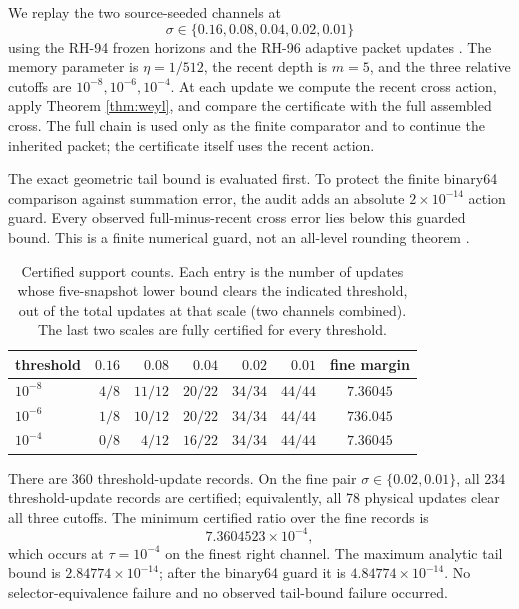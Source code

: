 \documentclass[11pt]{article}
\theoremstyle{definition}
\theoremstyle{remark}
\begin{document}
We replay the two source-seeded channels at
\[
 \sigma\in\{0.16,0.08,0.04,0.02,0.01\}
\]
using the RH-94 frozen horizons and the RH-96 adaptive packet updates
\citep{WangWeakMode2026}.  The
memory parameter is $\eta=1/512$, the recent depth is $m=5$, and the three
relative cutoffs are $10^{-8},10^{-6},10^{-4}$.  At each update we compute
the recent cross action, apply Theorem \ref{thm:weyl}, and compare the
certificate with the full assembled cross.  The full chain is used only as
the finite comparator and to continue the inherited packet; the certificate
itself uses the recent action.

The exact geometric tail bound is evaluated first.  To protect the finite
binary64 comparison against summation error, the audit adds an absolute
$2\times10^{-14}$ action guard.  Every observed full-minus-recent cross error
lies below this guarded bound.  This is a finite numerical guard, not an
all-level rounding theorem \citep{Rump2010}.

\begin{table}[t]
\centering
\small
\caption{Certified support counts.  Each entry is the number of updates whose
five-snapshot lower bound clears the indicated threshold, out of the total
updates at that scale (two channels combined).  The last two scales are fully
certified for every threshold.}
\label{tab:counts}
\begin{tabular}{@{}lrrrrr c@{}}
\toprule
threshold & $0.16$ & $0.08$ & $0.04$ & $0.02$ & $0.01$ & fine margin\\
\midrule
$10^{-8}$ & $4/8$ & $11/12$ & $20/22$ & $34/34$ & $44/44$ & $7.36045$\\
$10^{-6}$ & $1/8$ & $10/12$ & $20/22$ & $34/34$ & $44/44$ & $736.045$\\
$10^{-4}$ & $0/8$ & $4/12$ & $16/22$ & $34/34$ & $44/44$ & $7.36045$\\
\bottomrule
\end{tabular}
\end{table}

There are 360 threshold-update records.  On the fine pair
$\sigma\in\{0.02,0.01\}$, all 234 threshold-update records are certified;
equivalently, all 78 physical updates clear all three cutoffs.  The minimum
certified ratio over the fine records is
\begin{equation}
 7.3604523\times10^{-4},
 \label{eq:finevalue}
\end{equation}
which occurs at $\tau=10^{-4}$ on the finest right channel.  The maximum
analytic tail bound is $2.84774\times10^{-14}$; after the binary64 guard it
is $4.84774\times10^{-14}$.  No selector-equivalence failure and no observed
tail-bound failure occurred.
\end{document}
